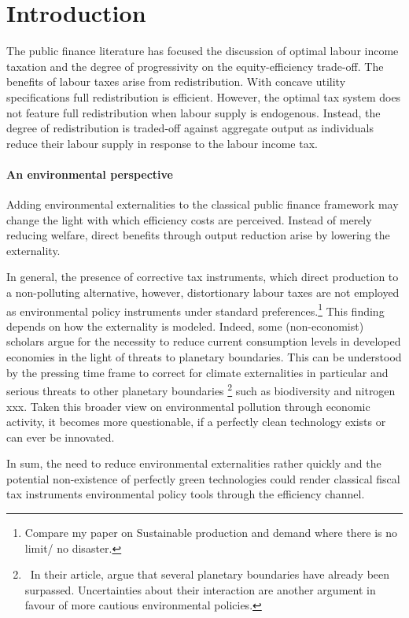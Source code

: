 
\section{Introduction}
The public finance literature has focused the discussion of optimal labour income taxation and the degree of progressivity on the equity-efficiency trade-off.  The benefits of labour taxes arise from redistribution. With concave utility specifications full redistribution is efficient. However, the optimal tax system does not feature full redistribution when labour supply is endogenous. Instead, the degree of redistribution is traded-off against aggregate output as individuals reduce their labour supply in response to the labour income tax. 

\paragraph{An environmental perspective}
 Adding environmental externalities to the classical public finance framework may change the light with which efficiency costs are perceived. Instead of merely reducing welfare, direct benefits through output reduction arise by lowering the externality. 

In general, the presence of corrective tax instruments, which direct production to a non-polluting alternative, however, distortionary labour taxes are not employed as environmental policy instruments under standard preferences.\footnote{ Compare my paper on Sustainable production and demand where there is no limit/ no disaster.} This finding depends on how the externality is modeled. Indeed, some (non-economist) scholars argue for the necessity to reduce current consumption levels in developed economies in the light of threats to planetary boundaries. This can be understood by the pressing time frame to correct for climate externalities in particular and serious threats to other planetary boundaries \citep{Rockstrom2009AHumanity}\footnote{\ In their article, \cite{Rockstrom2009AHumanity} argue that several planetary boundaries have already been surpassed. Uncertainties about their interaction are another argument in favour of more cautious environmental policies. } such as biodiversity and nitrogen xxx.
Taken this broader view on environmental pollution through economic activity, it becomes more questionable, if a perfectly clean technology exists or can ever be innovated.  

In sum, the need to reduce environmental externalities rather quickly and the potential non-existence of perfectly green technologies could render classical fiscal tax instruments environmental policy tools through the efficiency channel. 


